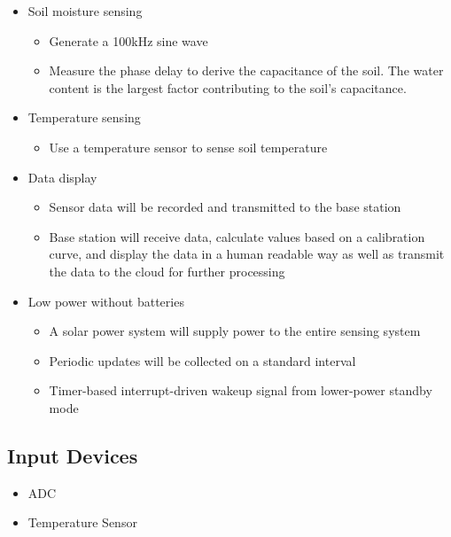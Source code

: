 \documentclass{article}
\begin{document}
\begin{itemize}
    \item Soil moisture sensing
        \begin{itemize}
            \item Generate a 100kHz sine wave
            \item Measure the phase delay to derive the capacitance of the
                soil.  The water content is the largest factor contributing to
                the soil's capacitance.
        \end{itemize}
    \item Temperature sensing
        \begin{itemize}
            \item Use a temperature sensor to sense soil temperature
        \end{itemize}
    \item Data display
        \begin{itemize}
            \item Sensor data will be recorded and transmitted to the base
                station
            \item Base station will receive data, calculate values based on a
                calibration curve, and display the data in a human readable way
                as well as transmit the data to the cloud for further
                processing
        \end{itemize}
    \item Low power without batteries
        \begin{itemize}
            \item A solar power system will supply power to the entire sensing
                system
            \item Periodic updates will be collected on a standard interval
            \item Timer-based interrupt-driven wakeup signal from lower-power
                standby mode
        \end{itemize}
\end{itemize}

\subsection{Input Devices}
\begin{itemize}
    \item ADC
    \item Temperature Sensor
\end{itemize}
\end{document}
